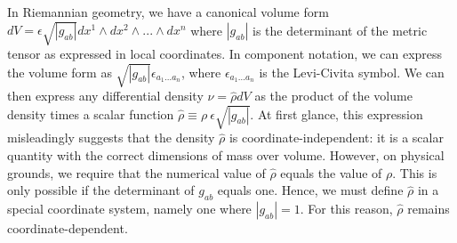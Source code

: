 \documentclass[letterpaper]{article}
\begin{document}
In Riemannian geometry, we have a canonical volume form $dV = \epsilon \sqrt{|g_{ab}|} dx^1 \wedge dx^2 \wedge ... \wedge dx^n$ where $|g_{ab}|$ is the determinant of the metric tensor as expressed in local coordinates. In component notation, we can express the volume form as $\sqrt{|g_{ab}|}\epsilon_{a_1 ... a_n}$, where $\epsilon_{a_1 ... a_n}$ is the Levi-Civita symbol. We can then express any differential density $\nu = \hat{\rho} dV$ as the product of the volume density times a scalar function $\hat{\rho} \equiv \rho \ \epsilon \sqrt{|g_{ab}|}$. At first glance, this expression misleadingly suggests that the density $\hat{\rho}$ is coordinate-independent: it is a scalar quantity with the correct dimensions of mass over volume. However, on physical grounds, we require that the numerical value of $\hat{\rho} $ equals the value of $\rho$. This is only possible if the determinant of $g_{ab}$ equals one. Hence, we must define $\hat{\rho} $ in a special coordinate system, namely one where $|g_{ab}| = 1$. For this reason, $\hat{\rho} $ remains coordinate-dependent. 
\end{document}
